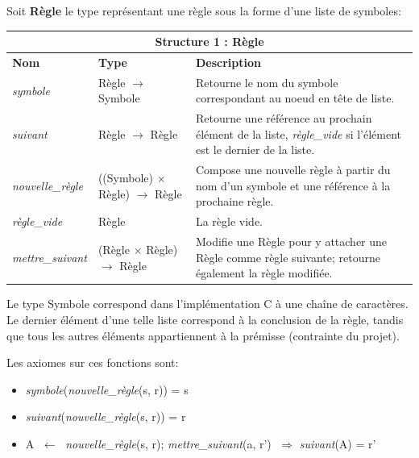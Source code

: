 \documentclass[12pt]{article}
\newcommand{\Assign}[2]{#1 $\; \longleftarrow \;$ #2}
\begin{document}
Soit \textbf{Règle} le type représentant une règle sous la forme d'une liste de symboles:





\begin{tabular}{|p{3cm}|p{4cm}|p{6.5cm}|}
  \hline
  \multicolumn{3}{|c|}{\textbf{Structure 1 :} Règle\label{R}} \\
  \hline
  \textbf{Nom} & \textbf{Type} & \textbf{Description} \\
  \hline
  \textit{symbole} & Règle $\rightarrow$ Symbole & Retourne le nom du symbole correspondant au noeud en tête de liste. \\
  \hline
  \textit{suivant} & Règle $\rightarrow$ Règle & Retourne une référence au prochain élément de la liste, \textit{règle\_vide} si l'élément est le dernier de la liste. \\
  \hline
  \textit{nouvelle\_règle} & ((Symbole) $\times$ Règle) $\rightarrow$ Règle & Compose une nouvelle règle à partir du nom d'un symbole et une référence à la prochaine règle. \\
  \hline
  \textit{règle\_vide} & Règle & La règle vide. \\
  \hline
  \textit{mettre\_suivant} & (Règle $\times$ Règle) $\rightarrow$ Règle & Modifie une Règle pour y attacher une Règle comme règle suivante; retourne également la règle modifiée. \\
  \hline
\end{tabular}

Le type \og Symbole \fg correspond dans l'implémentation C à une chaîne de caractères.
Le dernier élément d'une telle liste correspond à la conclusion de la règle, tandis que tous les autres éléments appartiennent à la prémisse (contrainte du projet).

Les axiomes sur ces fonctions sont:

\begin{itemize}
\item \textit{symbole}(\textit{nouvelle\_règle}(s, r)) = s
\item \textit{suivant}(\textit{nouvelle\_règle}(s, r)) = r
\item \Assign{A}{\textit{nouvelle\_règle}(s, r)}; \textit{mettre\_suivant}(a, r') $\; \Rightarrow$ \textit{suivant}(A) = r'
\end{itemize}
\end{document}
